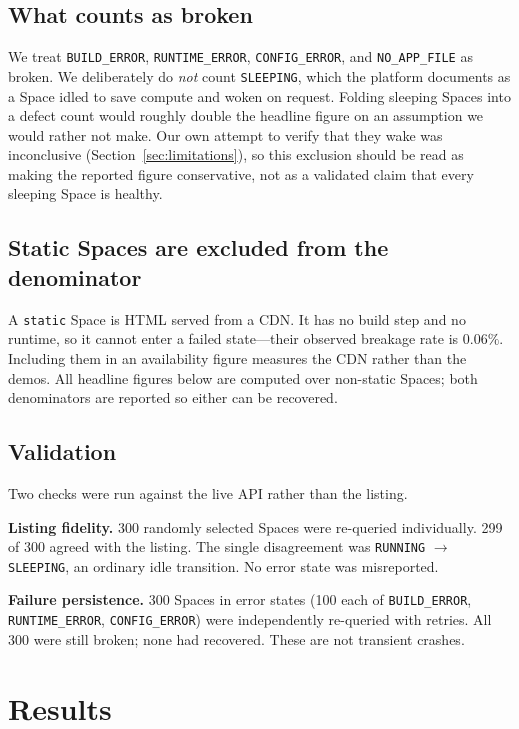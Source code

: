 \documentclass[11pt]{article}
\begin{document}
\subsection{What counts as broken}

We treat \texttt{BUILD\_ERROR}, \texttt{RUNTIME\_ERROR}, \texttt{CONFIG\_ERROR},
and \texttt{NO\_APP\_FILE} as broken. We deliberately do \emph{not} count
\texttt{SLEEPING}, which the platform documents as a Space idled to save
compute and woken on request. Folding sleeping Spaces into a defect count
would roughly double the headline figure on an assumption we would rather not
make. Our own attempt to verify that they wake was inconclusive
(Section~\ref{sec:limitations}), so this exclusion should be read as making the
reported figure conservative, not as a validated claim that every sleeping
Space is healthy.

\subsection{Static Spaces are excluded from the denominator}

A \texttt{static} Space is HTML served from a CDN. It has no build step and no
runtime, so it cannot enter a failed state---their observed breakage rate is
$0.06\%$. Including them in an availability figure measures the CDN rather than
the demos. All headline figures below are computed over non-static Spaces; both
denominators are reported so either can be recovered.

\subsection{Validation}

Two checks were run against the live API rather than the listing.

\textbf{Listing fidelity.} 300 randomly selected Spaces were re-queried
individually. 299 of 300 agreed with the listing. The single disagreement was
\texttt{RUNNING} $\rightarrow$ \texttt{SLEEPING}, an ordinary idle transition.
No error state was misreported.

\textbf{Failure persistence.} 300 Spaces in error states (100 each of
\texttt{BUILD\_ERROR}, \texttt{RUNTIME\_ERROR}, \texttt{CONFIG\_ERROR}) were
independently re-queried with retries. All 300 were still broken; none had
recovered. These are not transient crashes.

\section{Results}
\end{document}
